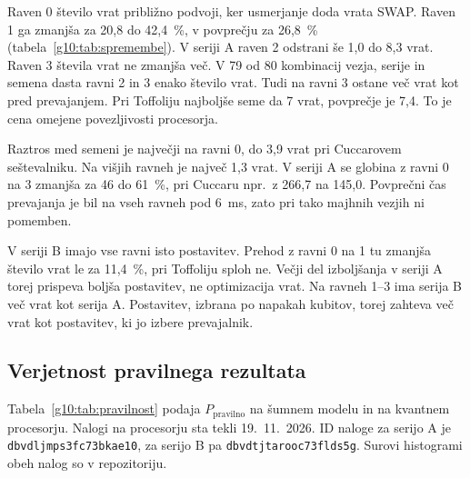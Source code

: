 Raven 0 število vrat približno podvoji,
ker usmerjanje doda vrata SWAP.
Raven 1 ga zmanjša za 20,8 do 42,4~\%,
v povprečju za 26,8~\% (tabela~\ref{g10:tab:spremembe}).
V seriji A raven 2 odstrani
še 1,0 do 8,3 vrat.
Raven 3 števila vrat ne zmanjša več.
V 79 od 80 kombinacij vezja, serije in semena
dasta ravni 2 in 3 enako število vrat.
Tudi na ravni 3 ostane več vrat kot pred prevajanjem.
Pri Toffoliju najboljše seme da 7 vrat, povprečje je 7,4.
To je cena omejene povezljivosti procesorja.

Raztros med semeni je največji na ravni 0,
do 3,9 vrat pri Cuccarovem seštevalniku.
Na višjih ravneh je največ 1,3 vrat.
V seriji A se globina z ravni 0 na 3
zmanjša za 46 do 61~\%,
pri Cuccaru npr.\ z 266,7 na 145,0.
Povprečni čas prevajanja je bil
na vseh ravneh pod 6~ms,
zato pri tako majhnih vezjih ni pomemben.

V seriji B imajo vse ravni isto postavitev.
Prehod z ravni 0 na 1 tu zmanjša število vrat
le za 11,4~\%, pri Toffoliju sploh ne.
Večji del izboljšanja v seriji A
torej prispeva boljša postavitev, ne optimizacija vrat.
Na ravneh 1--3 ima serija B
več vrat kot serija A.
Postavitev, izbrana po napakah kubitov,
torej zahteva več vrat kot postavitev,
ki jo izbere prevajalnik.


\subsection{Verjetnost pravilnega rezultata}
\label{g10:sec:rez_pravilnost}

Tabela~\ref{g10:tab:pravilnost} podaja $P_\text{pravilno}$
na šumnem modelu in na kvantnem procesorju.
Nalogi na procesorju sta tekli 19.~11.~2026.
ID naloge za serijo A je \texttt{dbvdljmps3fc73bkae10},
za serijo B pa \texttt{dbvdtjtarooc73flds5g}.
Surovi histogrami obeh nalog so v repozitoriju.

